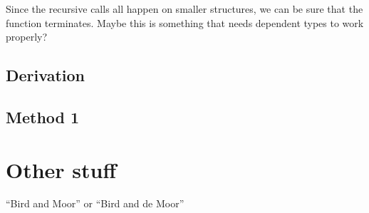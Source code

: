 \documentclass{article}
\begin{document}
Since the recursive calls all happen on smaller structures, we can be sure that the function terminates. Maybe this is something that needs dependent types to work properly?
\subsection{Derivation}
\subsection{Method 1}

\section{Other stuff}
``Bird and Moor'' or ``Bird and de Moor''
\newpage


\end{document}
